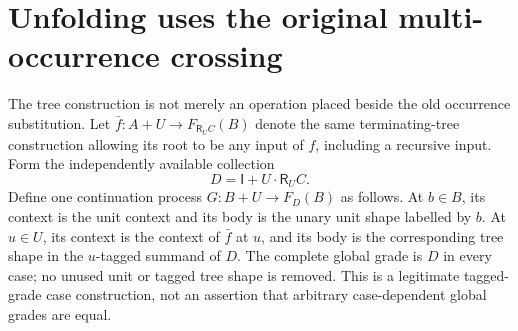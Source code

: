\documentclass[11pt]{article}
\newcommand{\R}{\mathsf R}\newcommand{\Col}{\mathsf{Col}}\newcommand{\Vect}{\mathbf{Vect}_k}
\begin{document}
\section{Unfolding uses the original multi-occurrence crossing}
The tree construction is not merely an operation placed beside the old occurrence substitution. Let $\bar f:A+U\to F_{\R_U C}(B)$ denote the same terminating-tree construction allowing its root to be any input of $f$, including a recursive input. Form the independently available collection
\[
 D=\mathsf I+U\cdot\R_U C.
\]
Define one continuation process $G:B+U\to F_D(B)$ as follows. At $b\in B$, its context is the unit context and its body is the unary unit shape labelled by $b$. At $u\in U$, its context is the context of $\bar f$ at $u$, and its body is the corresponding tree shape in the $u$-tagged summand of $D$. The complete global grade is $D$ in every case; no unused unit or tagged tree shape is removed. This is a legitimate tagged-grade case construction, not an assertion that arbitrary case-dependent global grades are equal.
\end{document}
